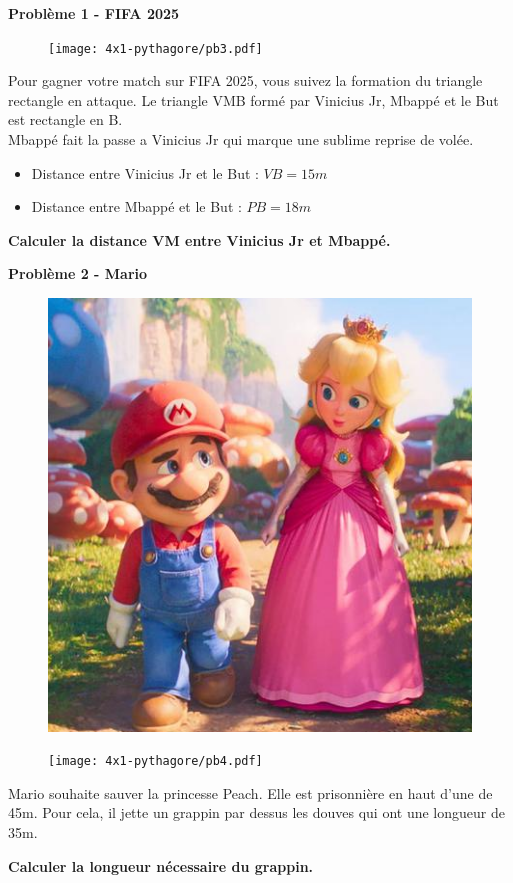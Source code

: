 \textbf{Problème 1 - FIFA 2025} \\

\begin{figure}[H]
  \centering
  \texttt{[image: 4x1-pythagore/pb3.pdf]}
\end{figure}
  
Pour gagner votre match sur FIFA 2025, vous suivez la formation du triangle rectangle en attaque. Le triangle VMB formé par Vinicius Jr, Mbappé et le But est rectangle en B. \\
  
Mbappé fait la passe a Vinicius Jr qui marque une sublime reprise de volée. 
  
\begin{itemize}
  \item Distance entre Vinicius Jr et le But : $VB = 15m$
  \item Distance entre Mbappé et le But : $PB = 18m$
\end{itemize}
  
\textbf{Calculer la distance VM entre Vinicius Jr et Mbappé.} 

\newpage

\begin{multicols}{2} 
  \textbf{Problème 2 - Mario} \\
  
  \begin{figure}[H]
    \centering
    \includegraphics[width=0.3\linewidth]{4x1-pythagore/pb4-mario.png}
  \end{figure}

  \begin{figure}[H]
    \centering
    \texttt{[image: 4x1-pythagore/pb4.pdf]}
  \end{figure}
\end{multicols}

Mario souhaite sauver la princesse Peach. Elle est prisonnière en haut d'une de 45m. Pour cela, il jette un grappin par dessus les douves qui ont une longueur de 35m. 
  
\textbf{Calculer la longueur nécessaire du grappin.} \\


